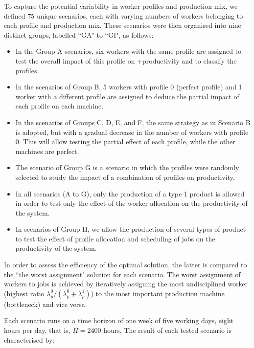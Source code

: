 \documentclass[review,12pt, 3p, times]{elsarticle}
\begin{document}
To capture the potential variability in worker profiles and production mix, we defined 75 unique scenarios, each with varying numbers of workers belonging to each profile and production mix. These scenarios were then organised into nine distinct groups, labelled “GA" to “GI", as follows:
\begin{itemize}
    \item In the Group A scenarios, six workers with the same profile are assigned to test the overall impact of this profile on +productivity and to classify the profiles. 
    \item In the scenarios of Group B, 5 workers with profile 0 (perfect profile) and 1 worker with a different profile are assigned to deduce the partial impact of each profile on each machine.
    \item In the scenarios of Groups C, D, E, and F, the same strategy as in Scenario B is adopted, but with a gradual decrease in the number of workers with profile 0. This will allow testing the partial effect of each profile, while the other machines are perfect. 
    \item The scenario of Group G is a scenario in which the profiles were randomly selected to study the impact of a combination of profiles on productivity.
    \item  In all scenarios (A to G), only the production of a type 1 product is allowed in order to test only the effect of the worker allocation on the productivity of the system.
    \item In scenarios of Group H, we allow the production of several types of product to test the effect of profile allocation and scheduling of jobs on the productivity of the system.  
\end{itemize}
					
In order to assess the efficiency of the optimal solution, the latter is compared to the “the worst assignment" solution for each scenario. The worst assignment of workers to jobs is achieved by iteratively assigning the most undisciplined worker (highest ratio $\lambda^0_p/(\lambda^0_p+\lambda^1_p)$) to the most important production machine (bottleneck) and vice versa.
					
Each scenario runs on a time horizon of one week of five working days, eight hours per day, that is, $H=2400$ hours. The result of each tested scenario is characterised by:
	
\end{document}

